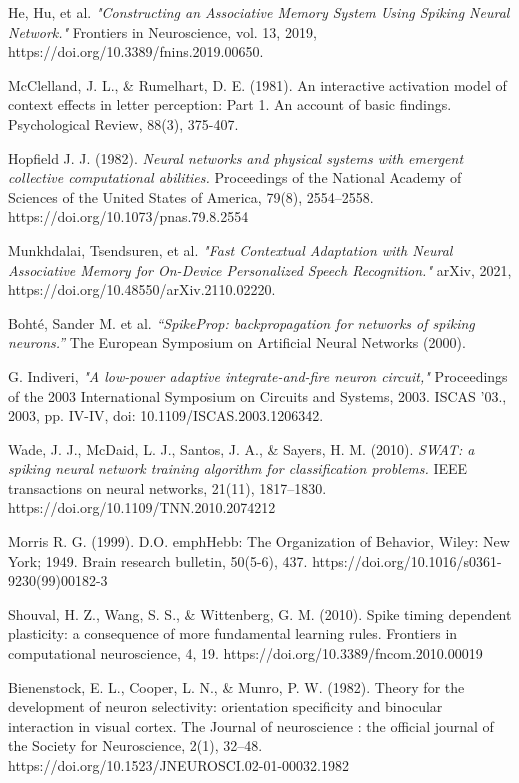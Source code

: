 \begin{thebibliography}{99}

	He, Hu, et al. \emph{"Constructing an Associative Memory System Using Spiking Neural Network."} Frontiers in Neuroscience, vol. 13, 2019, https://doi.org/10.3389/fnins.2019.00650.
	
	McClelland, J. L., \& Rumelhart, D. E. (1981). An interactive activation model of context effects in letter perception: Part 1. An account of basic findings. Psychological Review, 88(3), 375-407.
	
	Hopfield J. J. (1982). \emph{Neural networks and physical systems with emergent collective computational abilities.} Proceedings of the National Academy of Sciences of the United States of America, 79(8), 2554–2558. https://doi.org/10.1073/pnas.79.8.2554

	Munkhdalai, Tsendsuren, et al. \emph{"Fast Contextual Adaptation with Neural Associative Memory for On-Device Personalized Speech Recognition."} arXiv, 2021, https://doi.org/10.48550/arXiv.2110.02220.

	Bohté, Sander M. et al. \emph{“SpikeProp: backpropagation for networks of spiking neurons.”} The European Symposium on Artificial Neural Networks (2000).

	G. Indiveri, \emph{"A low-power adaptive integrate-and-fire neuron circuit,"} Proceedings of the 2003 International Symposium on Circuits and Systems, 2003. ISCAS '03., 2003, pp. IV-IV, doi: 10.1109/ISCAS.2003.1206342.

	Wade, J. J., McDaid, L. J., Santos, J. A., \& Sayers, H. M. (2010). \emph{SWAT: a spiking neural network training algorithm for classification problems.} IEEE transactions on neural networks, 21(11), 1817–1830. https://doi.org/10.1109/TNN.2010.2074212

	Morris R. G. (1999). D.O. emph{Hebb: The Organization of Behavior,} Wiley: New York; 1949. Brain research bulletin, 50(5-6), 437. https://doi.org/10.1016/s0361-9230(99)00182-3

	Shouval, H. Z., Wang, S. S., \& Wittenberg, G. M. (2010). Spike timing dependent plasticity: a consequence of more fundamental learning rules. Frontiers in computational neuroscience, 4, 19. https://doi.org/10.3389/fncom.2010.00019

	Bienenstock, E. L., Cooper, L. N., \& Munro, P. W. (1982). Theory for the development of neuron selectivity: orientation specificity and binocular interaction in visual cortex. The Journal of neuroscience : the official journal of the Society for Neuroscience, 2(1), 32–48. https://doi.org/10.1523/JNEUROSCI.02-01-00032.1982

\end{thebibliography}